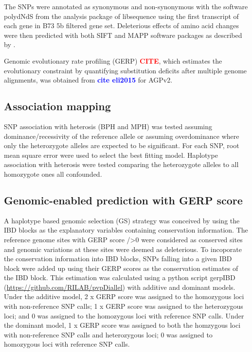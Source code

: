 \documentclass[9pt,twocolumn,twoside]{gsajnl}
\newcommand{\sme}[1]{\textcolor{red}{\bf #1}}
\newcommand{\yang}[1]{\textcolor{blue}{\bf #1}}
\begin{document}
The SNPs were annotated as synonymous and non-synonymous with the software polydNdS from the analysis package of libsequence  \citep{Thornton2003} using the first transcript of each gene in B73 5b filtered gene set. Deleterious effects of amino acid changes were then predicted with both SIFT \citep{Ng2003, Ng2006} and MAPP \citep{Stone2005} software packages as described by \citep{Mezmouk2014}.

Genomic evolutionary rate profiling (GERP) \sme{CITE}, which estimates the evolutionary constraint by quantifying substitution deficits after multiple genome alignments, was obtained from \yang{cite eli2015} for AGPv2. 

\subsection*{Association mapping}
SNP association with heterosis (BPH and MPH) was tested assuming dominance/recessivity of the reference allele or assuming overdominance where only the heterozygote alleles are expected to be significant. For each SNP, root mean square error were used to select the best fitting model. 
Haplotype association with heterosis were tested comparing the heterozygote alleles to all homozygote ones all confounded. 


\subsection*{Genomic-enabled prediction with GERP score}

A haplotype based genomic selection (GS) strategy was conceived by using the IBD blocks as the explanatory variables containing conservation information. The reference genome sites with GERP score />0 were considered as conserved sites and genomic variations at these sites were deemed as deleterious. To incoporate the conservation information into IBD blocks, SNPs falling into a given IBD block were added up using their GERP scores as the conservation estimates of the IBD block. This estimation was calculated using a python script gerpIBD (\url{https://github.com/RILAB/pvpDiallel}) with additive and dominant models. Under the additive model, 2 x GERP score was assigned to the homozygous loci with non-reference SNP calls; 1 x GERP score was assigned to the heterozygous loci; and 0 was assigned to the homozygous loci with reference SNP calls. Under the dominant model, 1 x GERP score was assigned to both the homzygous loci with non-reference SNP calls and heterozygous loci; 0 was assigned to homozygous loci with reference SNP calls.
\end{document}
